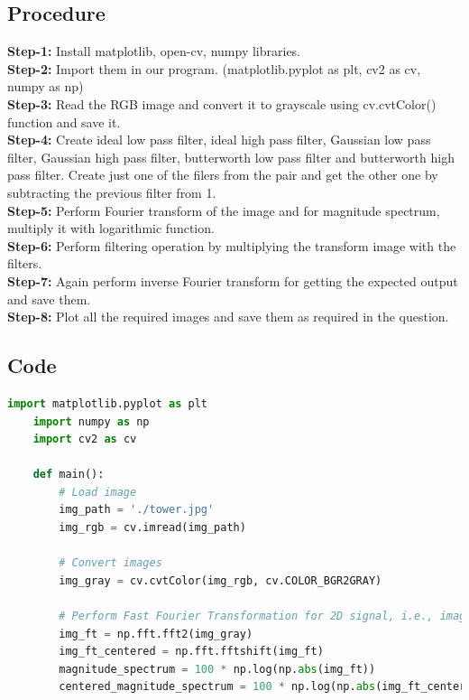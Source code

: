\documentclass{article}
\begin{document}
{    \subsection{Procedure}
    \textbf{Step-1:}
    Install matplotlib, open-cv, numpy libraries.\\
    \textbf{Step-2:}
    Import them in our program. (matplotlib.pyplot as plt, cv2 as cv, numpy as np)\\
    \textbf{Step-3:}
    Read the RGB image and convert it to grayscale using cv.cvtColor() function and save it.\\
    \textbf{Step-4:}
    Create ideal low pass filter, ideal high pass filter, Gaussian low pass filter, Gaussian high pass filter, butterworth low pass filter and butterworth high pass filter. Create just one of the filers from the pair and get the other one by subtracting the previous filter from 1.\\
    \textbf{Step-5:}
    Perform Fourier transform of the image and for magnitude spectrum, multiply it with logarithmic function.\\
    \textbf{Step-6:}
    Perform filtering operation by multiplying the transform image with the filters.\\
    \textbf{Step-7:}
    Again perform inverse Fourier transform for getting the expected output and save them.\\
    \textbf{Step-8:}
    Plot all the required images and save them as required in the question.\\
    
    \subsection{Code}
    \lstset{style=mystyle}
    \begin{lstlisting}[language=Python, caption=Code for applying filters in frequency domain]
    import matplotlib.pyplot as plt
    import numpy as np 
    import cv2 as cv
    
    def main():
        # Load image
        img_path = './tower.jpg'
        img_rgb = cv.imread(img_path)
    
        # Convert images
        img_gray = cv.cvtColor(img_rgb, cv.COLOR_BGR2GRAY)
    
        # Perform Fast Fourier Transformation for 2D signal, i.e., image
        img_ft = np.fft.fft2(img_gray)
        img_ft_centered = np.fft.fftshift(img_ft)
        magnitude_spectrum = 100 * np.log(np.abs(img_ft))
        centered_magnitude_spectrum = 100 * np.log(np.abs(img_ft_centered))
    

\end{lstlisting}}
\end{document}
